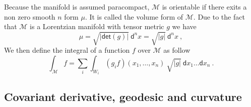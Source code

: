 \documentclass[11pt]{book}
\renewcommand{\det}{\mathsf{det}}
\newcommand{\abs}[1]{\left|#1\right|}
\newcommand{\Mcal}{\mathcal{M}}
\newcommand{\dsf}{\mathsf{d}}
\theoremstyle{break}
\begin{document}
Because the manifold is assumed paracompact, $\Mcal$ is orientable if there exits a non zero smooth $n$ form $\mu$. It is called the volume form of $\Mcal$. Due to the fact that $\Mcal$ is a Lorentzian manifold with tensor metric $g$ we have 
%
\begin{equation*}
\mu = \sqrt{\abs{\det\left(g\right)}} \ \dsf^n x = \sqrt{\abs{g}} \ \dsf^n x \ ,
\end{equation*}
%
We then define the integral of a function $f$ over $\Mcal$ as follow
%
\begin{equation}
\int_\Mcal f = \sum_i \int_{W_i} (g_i f)(x_1,\dots,x_n) \ \sqrt{\abs{g}} \ \dsf x_1 \dots \dsf x_n \ .
\label{eq:int_manifold}
\end{equation}


\subsection{Covariant derivative, geodesic and curvature}
\end{document}
